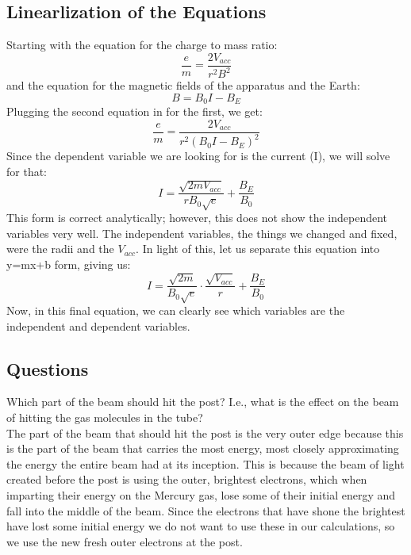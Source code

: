 \documentclass[aps,prl,10pt,twocolumn,floatfix]{revtex4-2}
\begin{document}
\subsection{Linearlization of the Equations}
Starting with the equation for the charge to mass ratio:
\begin{equation}
\frac{e}{m}=\frac{2V_{acc}}{r^2B^2}
\end{equation}
and the equation for the magnetic fields of the apparatus and the Earth:
\begin{equation}
B=B_0I-B_E
\end{equation}
Plugging the second equation in for the first, we get:
\begin{equation*}
\frac{e}{m}=\frac{2V_{acc}}{r^2(B_0I-B_E)^2}
\end{equation*}
Since the dependent variable we are looking for is the current (I), we will solve for that:
\begin{equation*}
I=\frac{\sqrt{2mV_{acc}}}{rB_0\sqrt{e}}+\frac{B_E}{B_0}
\end{equation*}
This form is correct analytically;
however, this does not show the independent variables very well.
The independent variables, the things we changed and fixed, were the radii and the $V_{acc}$.
In light of this, let us separate this equation into y=mx+b form, giving us:
\begin{equation}
I=\frac{\sqrt{2m}}{B_0\sqrt{e}}\cdot \frac{\sqrt{V_{acc}}}{r}+\frac{B_E}{B_0}
\end{equation}
Now, in this final equation, we can clearly see which variables are the independent and dependent variables.
\subsection{Questions}
Which part of the beam should hit the post? I.e., what is the effect on the beam of hitting the gas
molecules in the tube?\\
The part of the beam that should hit the post is the very outer edge because this is the part of the beam that carries the most energy, most closely approximating the energy the entire beam had at its inception.
This is because the beam of light created before the post is using the outer, brightest electrons, which when imparting their energy on the Mercury gas, lose some of their initial energy and fall into the middle of the beam.
Since the electrons that have shone the brightest have lost some initial energy we do not want to use these in our calculations, so we use the new fresh outer electrons at the post.
\end{document}

